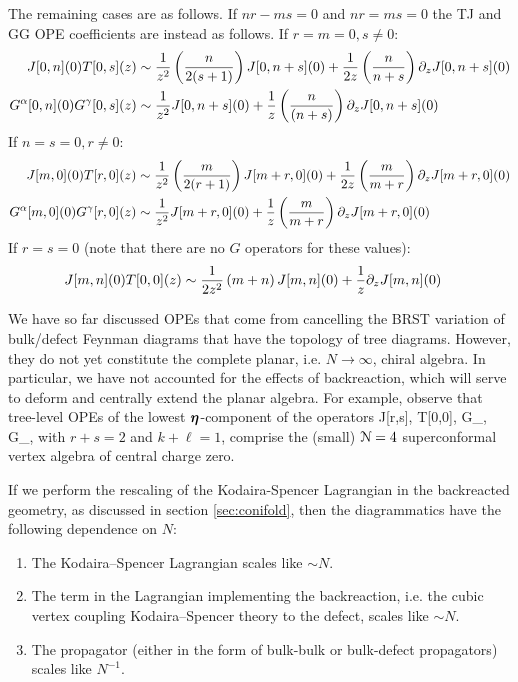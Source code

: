 \documentclass[../main.tex]{subfiles}
\begin{document}
The remaining cases are as follows. If $nr-ms = 0$ and $n r = ms = 0$ the TJ and GG OPE coefficients are instead as follows. \newline
If $r = m = 0, s \neq 0$: 
\begin{align}
J[0, n](0)T[0, s](z) &\sim {1 \over z^2}\left({n \over 2(s + 1)}\right)J[0, n + s](0) +{1 \over 2 z}\left({n \over n + s} \right)\partial_z J[0, n + s](0) \\ \nonumber
G^{\alpha}[0, n](0)G^{\gamma}[0, s](z) &\sim {1 \over z^2}J[0, n + s](0) +{1 \over z}\left({n \over  (n + s)}\right)\partial_z J[0, n+s](0)
\end{align}
If $n = s = 0, r \neq 0$: 
\begin{align}
J[m, 0](0)T[r, 0](z) &\sim {1 \over z^2}\left({m \over 2(r + 1)}\right)J[m + r, 0](0) +{1 \over 2 z}\left({m \over m + r} \right)\partial_z J[m + r, 0](0)\\
G^{\alpha}[m, 0](0)G^{\gamma}[r, 0](z) &\sim {1 \over z^2}J[m + r, 0](0) +{1 \over z}\left({m \over m + r}\right)\partial_z J[m + r, 0](0)
\end{align}
If $r = s= 0$ (note that there are no $G$ operators for these values):
\begin{align}
J[m, n](0)T[0, 0](z) &\sim {1 \over 2 z^2}\left(m + n\right)J[m , n ](0) +{1 \over  z}\partial_z J[m , n ](0)
\end{align}

We have so far discussed OPEs that come from cancelling the BRST variation of bulk/defect Feynman diagrams that have the topology of tree diagrams. However, they do not yet constitute the complete planar, i.e. $N \rightarrow \infty$, chiral algebra. In particular, we have not accounted for the effects of backreaction, which will serve to deform and centrally extend the planar algebra. 
For example, observe that tree-level OPEs of the lowest $\boldsymbol\eta$-component of the operators
\beqn
J[r,s], T[0,0], G_\alpha[k,\ell], G_\gamma[k,\ell],
\eeqn
with $r+s=2$ and $k+\ell=1$, comprise the (small) $\mathcal{N}=4$ superconformal vertex algebra of central charge zero.

If we perform the rescaling of the Kodaira-Spencer Lagrangian in the backreacted geometry, as discussed in section \ref{sec:conifold}, then the diagrammatics have the following dependence on $N$: 
\begin{enumerate}
\item The Kodaira--Spencer Lagrangian scales like $\sim N$. \\
\item The term in the Lagrangian implementing the backreaction, i.e. the cubic vertex coupling Kodaira--Spencer theory to the defect, scales like $\sim N$. \\
\item The propagator (either in the form of bulk-bulk or bulk-defect propagators) scales like $N^{-1}$.
\end{enumerate}
\end{document}
